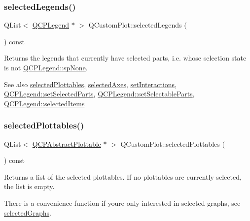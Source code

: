 \subsubsection{\texorpdfstring{selected\+Legends()}{selectedLegends()}}
{\footnotesize\ttfamily Q\+List$<$ \hyperlink{class_q_c_p_legend}{Q\+C\+P\+Legend} $\ast$ $>$ Q\+Custom\+Plot\+::selected\+Legends (\begin{DoxyParamCaption}{ }\end{DoxyParamCaption}) const}

Returns the legends that currently have selected parts, i.\+e. whose selection state is not \hyperlink{class_q_c_p_legend_a5404de8bc1e4a994ca4ae69e2c7072f1a378201c07d500af7126e3ec91652eed7}{Q\+C\+P\+Legend\+::sp\+None}.

\begin{DoxySeeAlso}{See also}
\hyperlink{class_q_custom_plot_a747faaab57c56891e901a1e97fa4359a}{selected\+Plottables}, \hyperlink{class_q_custom_plot_a7e6b07792b1cb2c31681596582d14dbe}{selected\+Axes}, \hyperlink{class_q_custom_plot_a5ee1e2f6ae27419deca53e75907c27e5}{set\+Interactions}, \hyperlink{class_q_c_p_legend_a2aee309bb5c2a794b1987f3fc97f8ad8}{Q\+C\+P\+Legend\+::set\+Selected\+Parts}, \hyperlink{class_q_c_p_legend_a9ce60aa8bbd89f62ae4fa83ac6c60110}{Q\+C\+P\+Legend\+::set\+Selectable\+Parts}, \hyperlink{class_q_c_p_legend_ac7d9e567d5c551e09cd9bcc4306c5532}{Q\+C\+P\+Legend\+::selected\+Items} 
\end{DoxySeeAlso}
\hypertarget{class_q_custom_plot_a747faaab57c56891e901a1e97fa4359a}{}\label{class_q_custom_plot_a747faaab57c56891e901a1e97fa4359a} 
\subsubsection{\texorpdfstring{selected\+Plottables()}{selectedPlottables()}}
{\footnotesize\ttfamily Q\+List$<$ \hyperlink{class_q_c_p_abstract_plottable}{Q\+C\+P\+Abstract\+Plottable} $\ast$ $>$ Q\+Custom\+Plot\+::selected\+Plottables (\begin{DoxyParamCaption}{ }\end{DoxyParamCaption}) const}

Returns a list of the selected plottables. If no plottables are currently selected, the list is empty.

There is a convenience function if you\textquotesingle{}re only interested in selected graphs, see \hyperlink{class_q_custom_plot_ad3547aded026d8a9ae6ef13a69080d06}{selected\+Graphs}.

